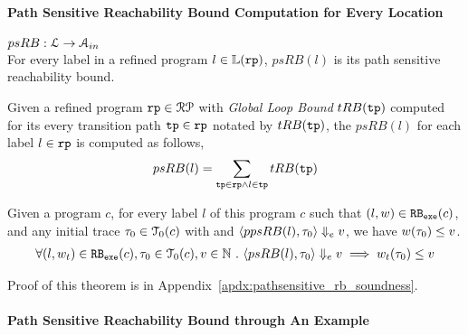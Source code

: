 \paragraph*{Path Sensitive Reachability Bound Computation for Every Location}
$psRB : \mathcal{L} \to \mathcal{A}_{in}$
\\
For every label in a refined program $l \in \mathbb{L}(\mathtt{rp})$,
 $psRB(l)$ is its path sensitive reachability bound.
 \\
 \begin{defn}
  \label{def:label_psrb}
Given a refined program $\mathtt{rp} \in \mathcal{RP}$ with 
\emph{Global Loop Bound} $tRB(\mathtt{tp})$
computed for its every transition path $\mathtt{tp} \in \mathtt{rp}$  notated by $tRB(\mathtt{tp})$,
the $psRB(l)$ for each label $l \in \mathtt{rp}$ is computed as follows,
\\
\[ psRB(l) = \sum\limits_{\mathtt{tp} \in \mathtt{rp} \land 
l \in \mathtt{tp}} tRB(\mathtt{tp})\]
 \end{defn}
\begin{thm}
  \label{thm:pathsensitiverb_soundness}
Given a program ${c}$, for every label $l$ of this program $c$ such that $(l, w) \in \mathtt{RB_{exe}}(c)$, 
and any initial trace $\mathtt{\tau}_0 \in \mathcal{T}_0(c)$ with 
and $\langle ppsRB(l), \mathtt{\tau}_0 \rangle \Downarrow_e v$,
we have $ w(\mathtt{\tau}_0) \leq v $.
%
\[
  \begin{array}{l}
  \forall (l, w_{t}) \in \mathtt{RB_{exe}}(c),
  \mathtt{\tau}_0 \in \mathcal{T}_0(c), 
  v \in \mathbb{N} ~.~
  \langle psRB(l), \mathtt{\tau}_0 \rangle \Downarrow_e v
  \implies
  w_{t}(\mathtt{\tau}_0) \leq v
  \end{array}
\]
\end{thm}
%
Proof of this theorem is in Appendix~\ref{apdx:pathsensitive_rb_soundness}.
\paragraph*{Path Sensitive Reachability Bound through An Example}
